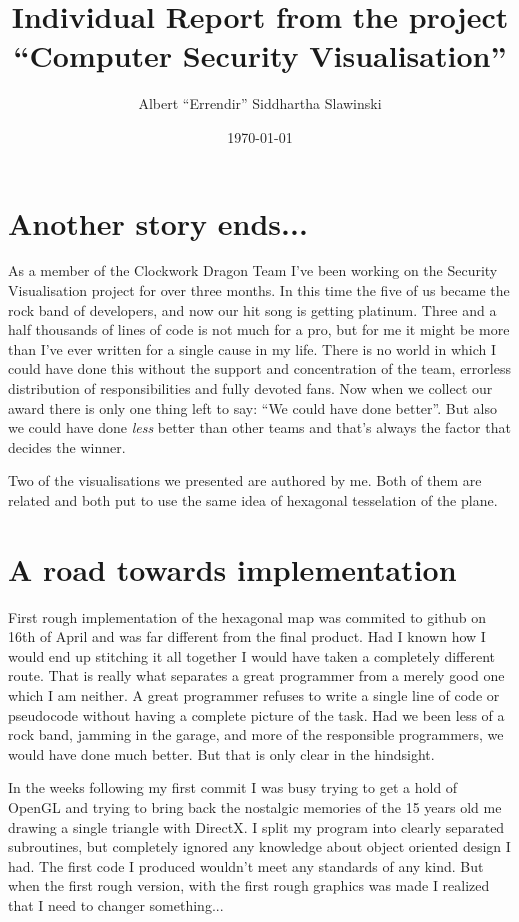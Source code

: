 \documentclass[12pt,a4paper]{article}
\author{Albert ``Errendir'' Siddhartha Slawinski}
\title{Individual Report from the project ``Computer Security Visualisation''}
\date{\today}
\begin{document}
	
	\maketitle

    \section*{Another story ends...}
	As a member of the Clockwork Dragon Team I've been working on the Security Visualisation project for over three months. In this time the five of us became the rock band of developers, and now our hit song is getting platinum.
	Three and a half thousands of lines of code is not much for a pro, but for me it might be more than I've ever written for a single cause in my life. There is no world in which I could have done this without the support and concentration of the team, errorless distribution of responsibilities and fully devoted fans.
	Now when we collect our award there is only one thing left to say: ``We could have done better''. But also we could have done \emph{less} better than other teams and that's always the factor that decides the winner.
	
	Two of the visualisations we presented are authored by me. Both of them are related and both put to use the same idea of hexagonal tesselation of the plane.
    \section*{A road towards implementation}
	First rough implementation of the hexagonal map was commited to github on 16th of April and was far different from the final product. Had I known how I would end up stitching it all together I would have taken a completely different route.
	That is really what separates a great programmer from a merely good one \textemdash  which I am neither. A great programmer refuses to write a single line of code or pseudocode without having a complete picture of the task. Had we been less of a rock band, jamming in the garage, and more of the responsible programmers, we would have done much better. But that is only clear in the hindsight.
	
	
	
	In the weeks following my first commit I was busy trying to get a hold of OpenGL and trying to bring back the nostalgic memories of the 15 years old me drawing a single triangle with DirectX. I split my program into clearly separated subroutines, but completely ignored any knowledge about object oriented design I had. The first code I produced wouldn't meet any standards of any kind.
	But when the first rough version, with the first rough graphics was made I realized that I need to changer something...
\end{document}
